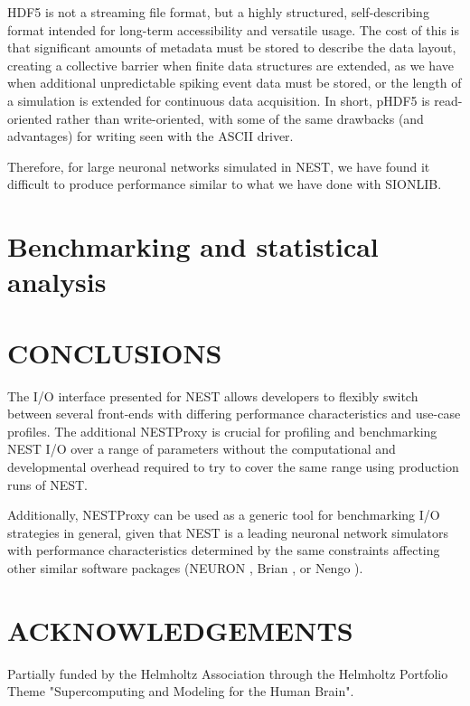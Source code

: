 \documentclass[]{YIC2015}
\begin{document}
HDF5 is not a streaming file format, but a highly structured,
self-describing format intended for long-term accessibility and
versatile usage. The cost of this is that significant amounts of
metadata must be stored to describe the data layout, creating a
collective barrier when finite data structures are extended, as we
have when additional unpredictable spiking event data must be stored,
or the length of a simulation is extended for continuous data
acquisition. In short, pHDF5 is read-oriented rather than
write-oriented, with some of the same drawbacks (and advantages) for
writing seen with the ASCII driver.

Therefore, for large neuronal networks simulated in NEST, we have
found it difficult to produce performance similar to what we have done
with SIONLIB.

\section{Benchmarking and statistical analysis}


\section{CONCLUSIONS}

The I/O interface presented for NEST allows developers to flexibly
switch between several front-ends with differing performance
characteristics and use-case profiles. The additional NESTProxy is
crucial for profiling and benchmarking NEST I/O over a range of
parameters without the computational and developmental overhead
required to try to cover the same range using production runs of
NEST.

Additionally, NESTProxy can be used as a generic tool for benchmarking
I/O strategies in general, given that NEST is a leading neuronal
network simulators with performance characteristics determined by the
same constraints affecting other similar software packages (NEURON
\cite{neuron}, Brian \cite{brian}, or Nengo \cite{nengo}).

\section*{ACKNOWLEDGEMENTS}

Partially funded by the Helmholtz Association through the Helmholtz
Portfolio Theme "Supercomputing and Modeling for the Human Brain".
\end{document}
